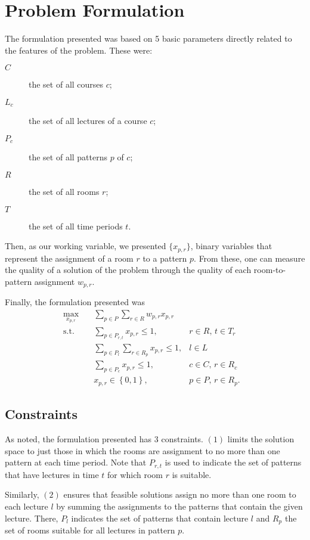 \section{Problem Formulation}

The formulation presented was based on 5 basic parameters directly related to the features of the problem. These were:
\begin{description}
	\item[$C$] the set of all courses $c$;
	\item[$L_c$] the set of all lectures of a course $c$;
	\item[$P_c$] the set of all patterns $p$ of $c$;
	\item[$R$] the set of all rooms $r$;
	\item[$T$] the set of all time periods $t$.
\end{description}

Then, as our working variable, we presented $\{x_{p,r}\} $, binary variables that represent the assignment of a room $r$ to a pattern $p$. From these, one can measure the quality of a solution of the problem through the quality of each room-to-pattern assignment $w_{p,r}$.

Finally, the formulation presented was
\begin{align*}
    \max_{x_{p,r}} \quad & \sum_{p \in P} \sum_{r\in R} w_{p,r}x_{p,r} \\
    \textrm{s.t.} \quad & \sum_{p \in P_{r,t}} x_{p,r} \le 1, & r\in R,\,t\in T_r  & \tag{1} \\
			& \sum_{p \in P_l} \sum_{r \in R_p} x_{p,r} \le 1, & l \in L  & \tag{2} \\
			& \sum_{p \in P_c} x_{p,r} \le 1, & c \in C,\, r \in R_c  & \tag{3} \\
			& x_{p,r} \in \left\{ 0,1 \right\}, & p \in P,\, r\in R_p
.\end{align*}

\subsection{Constraints}

As noted, the formulation presented has 3 constraints. $(1)$ limits the solution space to just those in which the rooms are assignment to no more than one pattern at each time period. Note that $P_{r,t}$ is used to indicate the set of patterns that have lectures in time $t$ for which room $r$ is suitable.

Similarly, $(2)$ ensures that feasible solutions assign no more than one room to each lecture $l$ by summing the assignments to the patterns that contain the given lecture. There, $P_l$ indicates the set of patterns that contain lecture $l$ and $R_p$ the set of rooms suitable for all lectures in pattern $p$.

